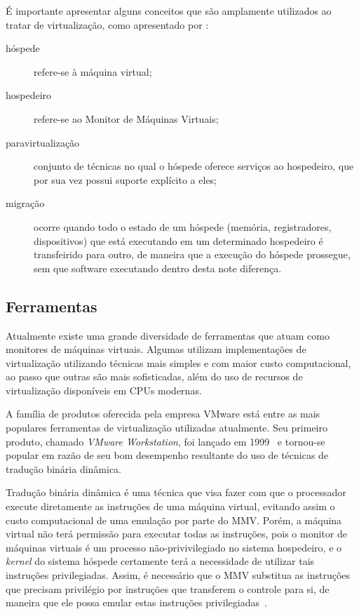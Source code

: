 

É importante apresentar alguns conceitos que são amplamente utilizados ao
tratar de virtualização, como apresentado por
:
\begin{description}
  \item[hóspede] refere-se à máquina virtual;
  \item[hospedeiro] refere-se ao Monitor de Máquinas Virtuais;
  \item[paravirtualização] conjunto de técnicas no qual o hóspede oferece
        serviços ao hospedeiro, que por sua vez possui suporte explícito a
        eles;
  \item[migração] ocorre quando todo o estado de um hóspede
       (memória, registradores, dispositivos) que está executando em um
       determinado hospedeiro é transfeirido para outro, de maneira que a
       execução do hóspede prossegue, sem que software executando dentro
       desta note diferença.
\end{description}

\subsection{Ferramentas}

Atualmente existe uma grande diversidade de ferramentas que atuam como
monitores de máquinas virtuais. Algumas utilizam implementações de
virtualização utilizando técnicas mais simples e com maior custo
computacional, ao passo que outras são mais sofisticadas, além do uso de
recursos de virtualização disponíveis em CPUs modernas.

A família de produtos oferecida pela empresa VMware está entre as mais
populares ferramentas de virtualização utilizadas atualmente. Seu primeiro
produto, chamado \emph{VMware Workstation}, foi lançado em
1999~\cite{vmwareMilestones} e tornou-se popular em razão de seu bom
desempenho resultante do uso de técnicas de tradução binária dinâmica.

Tradução binária dinâmica é uma técnica que visa fazer com que o processador
execute diretamente as instruções de uma máquina virtual, evitando assim o
custo computacional de uma emulação por parte do MMV. Porém, a máquina virtual
não terá permissão para executar todas as instruções, pois o monitor de
máquinas virtuais é um processo não-privivilegiado no sistema hospedeiro, e o
\emph{kernel} do sistema hóspede certamente terá a necessidade de utilizar tais
instruções privilegiadas. Assim, é necessário que o MMV substitua as instruções
que precisam privilégio por instruções que transferem o controle para si, de
maneira que ele possa emular estas instruções
privilegiadas~\cite{ung2000machine}.

